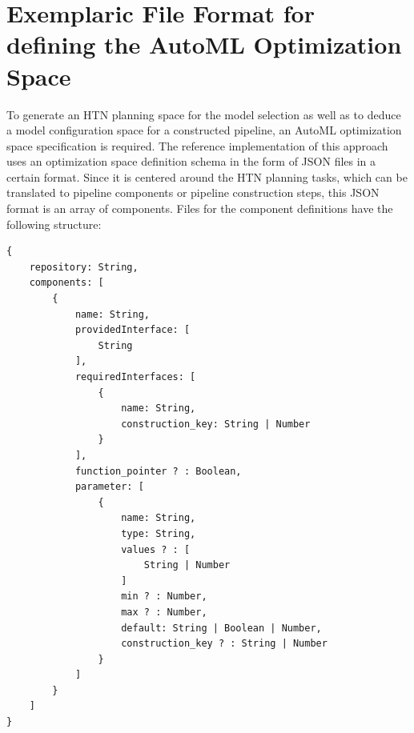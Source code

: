 \section{Exemplaric File Format for defining the AutoML Optimization Space}
\label{sec:implementation:json}
To generate an HTN planning space for the model selection as well as to deduce a model configuration space for a constructed pipeline, an AutoML optimization space specification is required.
The reference implementation of this approach uses an optimization space definition schema in the form of JSON files in a certain format.\newline
Since it is centered around the HTN planning tasks, which can be translated to pipeline components or pipeline construction steps, this JSON format is an array of components.
Files for the component definitions have the following structure:
\begin{verbatim}
{
    repository: String,
    components: [
        {
            name: String,
            providedInterface: [
                String
            ],
            requiredInterfaces: [
                {
                    name: String,
                    construction_key: String | Number
                }
            ],
            function_pointer ? : Boolean,
            parameter: [
                {
                    name: String,
                    type: String,
                    values ? : [
                        String | Number
                    ]
                    min ? : Number,
                    max ? : Number,
                    default: String | Boolean | Number,
                    construction_key ? : String | Number
                }
            ]
        }
    ]
}
\end{verbatim}

